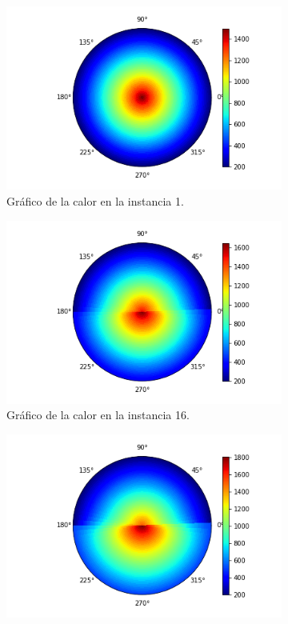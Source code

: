 \begin{figure}[H]
    \centering
    \begin{subfigure}{0.24\linewidth}
        \centering
        \includegraphics[scale=0.24]{img/EXP3/D3_40_80_0_calor}
        \caption{Gráfico de la calor en la instancia 1.}
        \label{fig:D3_40_80_0_calor}
    \end{subfigure}
    \hfill
    \begin{subfigure}{0.24\linewidth}
        \centering
        \includegraphics[scale=0.24]{img/EXP3/D3_40_80_15_calor}
        \caption{Gráfico de la calor en la instancia 16.}
        \label{fig:D3_40_80_15_calor}
    \end{subfigure}
    \hfill
    \begin{subfigure}{0.24\linewidth}
        \centering
        \includegraphics[scale=0.24]{img/EXP3/D3_40_80_31_calor}

\end{subfigure}
\end{figure}
